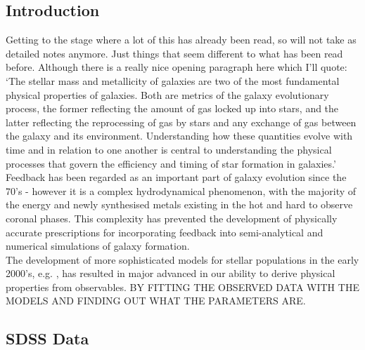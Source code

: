\documentclass{literature}
\begin{document}
\subsection{Introduction}
Getting to the stage where a lot of this has already been read, so will not take as detailed notes anymore. Just things that seem different to what has been read before. Although there is a really nice opening paragraph here which I'll quote: 
`The stellar mass and metallicity of galaxies are two of the most fundamental physical properties of galaxies. Both are metrics of the galaxy evolutionary process, the former reflecting the amount of gas locked up into stars, and the latter reflecting the reprocessing of gas by stars and any exchange of gas between the galaxy and its environment. Understanding how these quantities evolve with time and in relation to one another is central to understanding the physical processes that govern the efficiency and timing of star formation in galaxies.' \\ 

Feedback has been regarded as an important part of galaxy evolution since the 70's - however it is a complex hydrodynamical phenomenon, with the majority of the energy and newly synthesised metals existing in the hot and hard to observe coronal phases. This complexity has prevented the development of physically accurate prescriptions for incorporating feedback into semi-analytical and numerical simulations of galaxy formation. \\

The development of more sophisticated models for stellar populations in the early 2000's, e.g. \citep{Bruzual_2003}, has resulted in major advanced in our ability to derive physical properties from observables. BY FITTING THE OBSERVED DATA WITH THE MODELS AND FINDING OUT WHAT THE PARAMETERS ARE.
\subsection{SDSS Data}
\end{document}
